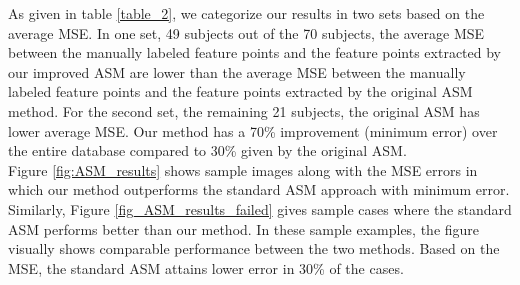As given in table \ref{table_2}, we categorize our results in two
sets based on the average MSE. In one set, 49 subjects out of the 70
subjects, the average MSE between the manually labeled feature
points and the feature points extracted by our improved ASM are
lower than the average MSE between the manually labeled feature
points and the feature points extracted by the original ASM method.
For the second set, the remaining 21 subjects, the original ASM has
lower average MSE. Our method has a 70\% improvement (minimum error)
over the entire database compared to 30\% given by the original ASM.
\\
Figure \ref{fig:ASM_results} shows sample images along with the MSE
errors in which our method outperforms the standard ASM approach
with minimum error. Similarly, Figure \ref{fig_ASM_results_failed}
gives sample cases where the standard ASM performs better than our
method. In these sample examples, the figure visually shows
comparable performance between the two methods. Based on the MSE,
the standard ASM attains lower error in 30\% of the cases.
